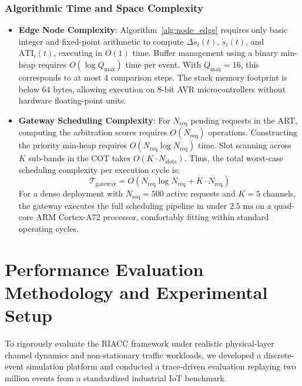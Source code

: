 \documentclass[preprint,review,12pt]{elsarticle}
\begin{document}
\subsubsection{Algorithmic Time and Space Complexity}

\begin{itemize}

    \item \textbf{Edge Node Complexity}: Algorithm~\ref{alg:node_edge} requires only basic integer and fixed-point arithmetic to compute $\Delta s_i(t)$, $\dot{s}_i(t)$, and $\text{ATI}_i(t)$, executing in $O(1)$ time. Buffer management using a binary min-heap requires $O(\log Q_{\text{max}})$ time per event. With $Q_{\text{max}} = 16$, this corresponds to at most 4 comparison steps. The stack memory footprint is below $64\text{ bytes}$, allowing execution on 8-bit AVR microcontrollers without hardware floating-point units.

    \item \textbf{Gateway Scheduling Complexity}: For $N_{\text{req}}$ pending requests in the ART, computing the arbitration scores requires $O(N_{\text{req}})$ operations. Constructing the priority min-heap requires $O(N_{\text{req}} \log N_{\text{req}})$ time. Slot scanning across $K$ sub-bands in the COT takes $O(K \cdot N_{\text{slots}})$. Thus, the total worst-case scheduling complexity per execution cycle is:
    \begin{equation}
    \mathcal{T}_{\text{gateway}} = O(N_{\text{req}} \log N_{\text{req}} + K \cdot N_{\text{req}})
    \end{equation}
    For a dense deployment with $N_{\text{req}} = 500$ active requests and $K = 5$ channels, the gateway executes the full scheduling pipeline in under $2.5\text{ ms}$ on a quad-core ARM Cortex-A72 processor, comfortably fitting within standard operating cycles.
\end{itemize}

\section{Performance Evaluation Methodology and Experimental Setup}
\label{sec:experimental_setup}

To rigorously evaluate the RIACC framework under realistic physical-layer channel dynamics and non-stationary traffic workloads, we developed a discrete-event simulation platform and conducted a trace-driven evaluation replaying two million events from a standardized industrial IoT benchmark.
\end{document}
